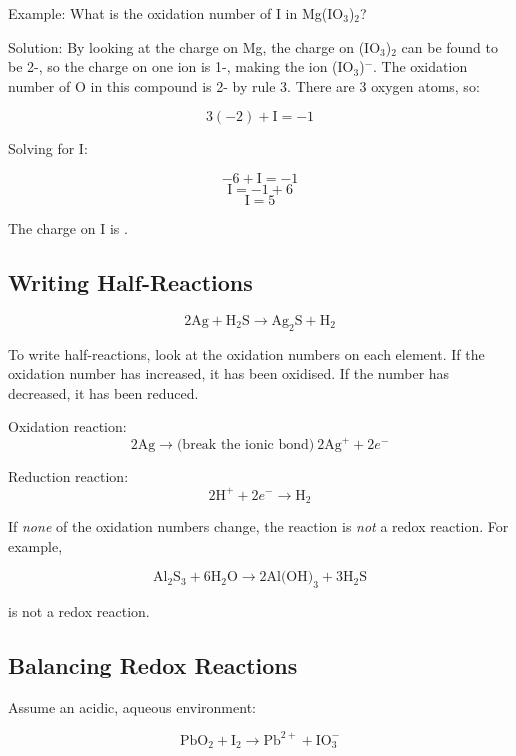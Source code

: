 \documentclass[a4paper, 12pt]{article}
\begin{document}
Example: What is the oxidation number of I in Mg(IO$_3$)$_2$?

Solution: By looking at the charge on Mg, the charge on (IO$_3$)$_2$ can be found to be 2-, so the charge on one ion is 1-, making the ion (IO$_3$)$^-$. The oxidation number of O in this compound is 2- by rule 3. There are 3 oxygen atoms, so:

$$3(-2) + \text{I} = -1$$

Solving for I:

$$-6 + \text{I} = -1$$
$$\text{I} = -1+6$$
$$\text{I} = 5$$

The charge on I is .

\subsection*{Writing Half-Reactions}
$$2\text{Ag} + \text{H}_2\text{S} \longrightarrow \text{Ag}_2\text{S} + \text{H}_2$$

To write half-reactions, look at the oxidation numbers on each element. If the oxidation number has increased, it has been oxidised. If the number has decreased, it has been reduced.

Oxidation  reaction:
$$2\text{Ag} \longrightarrow  \text{(break the ionic bond)} \: 2\text{Ag}^+ + 2e^-$$

Reduction  reaction:
$$2\text{H}^+ + 2e^- \longrightarrow \text{H}_2$$

If \textit{none} of the oxidation numbers change, the reaction is \textit{not} a redox reaction. For example,

$$\text{Al}_2\text{S}_3 + 6 \text{H}_2\text{O} \longrightarrow 2\text{Al(OH)}_3 + 3\text{H}_2\text{S}$$

is not a redox reaction.

\subsection*{Balancing Redox Reactions}
Assume an acidic, aqueous environment:

$$\text{PbO}_2 + \text{I}_2 \longrightarrow \text{Pb}^{2+} + \text{IO}_3^-$$
\end{document}
